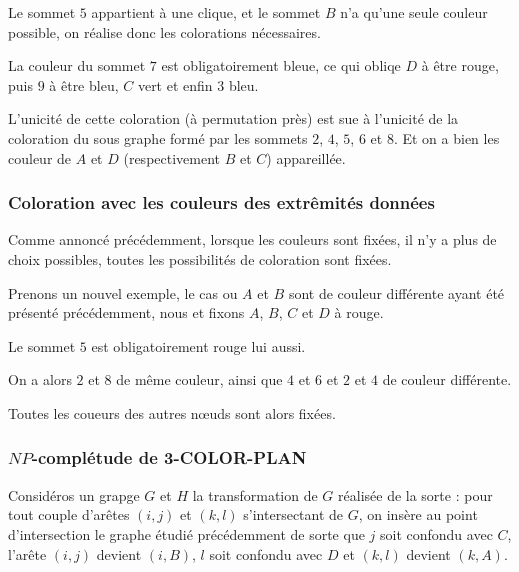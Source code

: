 

Le sommet $5$ appartient à une clique, et le sommet $B$ n'a qu'une seule couleur possible, on
réalise donc les colorations nécessaires.



La couleur du sommet $7$ est obligatoirement bleue, ce qui obliqe $D$ à être rouge, puis $9$ à être
bleu, $C$ vert et enfin $3$ bleu.



L'unicité de cette coloration (à permutation près) est sue à l'unicité de la coloration du sous
graphe formé par les sommets $2$, $4$, $5$, $6$ et $8$.
Et on a bien les couleur de $A$ et $D$ (respectivement $B$ et $C$) appareillée.

\subsubsection{Coloration avec les couleurs des extrêmités données}

Comme annoncé précédemment, lorsque les couleurs  sont fixées, il n'y a plus de choix possibles,
toutes les possibilités de coloration sont fixées.

Prenons un nouvel exemple, le cas ou $A$ et $B$ sont de couleur différente ayant été présenté
précédemment, nous et fixons $A$, $B$, $C$ et $D$ à rouge.



Le sommet $5$ est obligatoirement rouge lui aussi.



On a alors $2$ et $8$ de même couleur, ainsi que $4$ et $6$ et $2$ et $4$ de couleur différente.



Toutes les coueurs des autres n\oe uds sont alors fixées.



\subsubsection{$NP$-complétude de 3-COLOR-PLAN}

Considéros un grapge $G$ et $H$ la transformation de $G$ réalisée de la sorte : pour tout couple
d'arêtes $(i,j)$ et $(k,l)$ s'intersectant de $G$, on insère au point d'intersection le graphe
étudié précédemment de sorte que $j$ soit confondu avec $C$, l'arête $(i,j)$ devient $(i, B)$, $l$
soit confondu avec $D$ et $(k,l)$ devient $(k,A)$.

